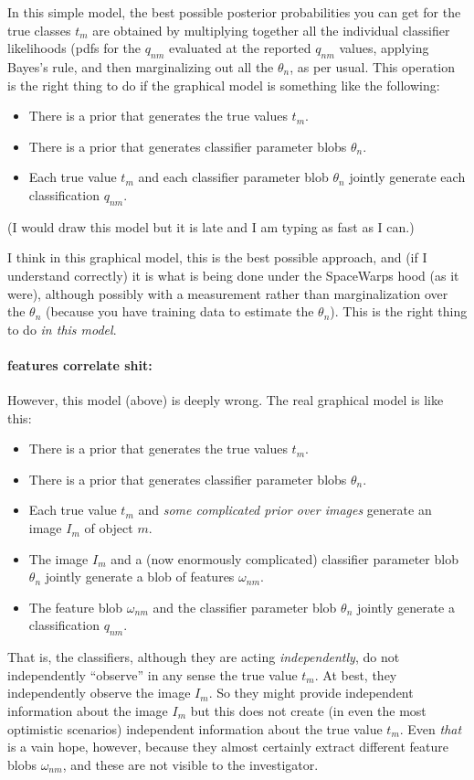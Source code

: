 \documentclass[12pt]{article}
\begin{document}
In this simple model,
  the best possible posterior probabilities you can get for the true classes $t_m$
  are obtained by multiplying together all the individual classifier likelihoods
  (pdfs for the $q_{nm}$ evaluated at the reported $q_{nm}$ values,
  applying Bayes's rule, and then marginalizing out all the $\theta_n$,
  as per usual.
This operation is the right thing to do if the graphical model is something like the following:
\begin{itemize}
\item
There is a prior that generates the true values $t_m$.
\item
There is a prior that generates classifier parameter blobs $\theta_n$.
\item
Each true value $t_m$ and each classifier parameter blob $\theta_n$ jointly generate each classification $q_{nm}$.
\end{itemize}
(I would draw this model but it is late and I am typing as fast as I can.)

I think in this graphical model, this is the best possible approach,
  and (if I understand correctly) it is what is being done under the SpaceWarps hood (as it were),
  although possibly with a measurement rather than marginalization over the $\theta_n$
  (because you have training data to estimate the $\theta_n$).
This is the right thing to do \emph{in this model}.

\paragraph{features correlate shit:}
However, this model (above) is deeply wrong.
The real graphical model is like this:
\begin{itemize}
\item
There is a prior that generates the true values $t_m$.
\item
There is a prior that generates classifier parameter blobs $\theta_n$.
\item
Each true value $t_m$ and \emph{some complicated prior over images} generate an image $I_m$ of object $m$.
\item
The image $I_m$ and a (now enormously complicated) classifier parameter blob $\theta_n$ jointly generate a blob of features $\omega_{nm}$.
\item
The feature blob $\omega_{nm}$ and the classifier parameter blob $\theta_n$ jointly generate a classification $q_{nm}$.
\end{itemize}
That is, the classifiers,
  although they are acting \emph{independently},
  do not independently ``observe'' in any sense the true value $t_m$.
At best, they independently observe the image $I_m$.
So they might provide independent information about the image $I_m$ but this
  does not create (in even the most optimistic scenarios) independent information about the true value $t_m$.
Even \emph{that} is a vain hope, however, because they almost certainly extract different feature blobs $\omega_{nm}$,
  and these are not visible to the investigator.
\end{document}
